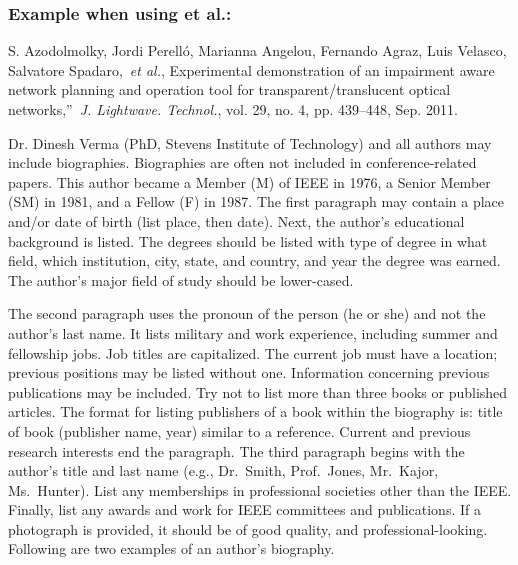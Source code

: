 \documentclass{IEEEoj}
\begin{document}
\subsubsection*{Example when using et al.:}

\begin{thebibliography}{00}
 S. Azodolmolky, Jordi Perell\'{o}, Marianna Angelou, Fernando Agraz, Luis Velasco, Salvatore Spadaro,~\textit{et al.}, Experimental demonstration of an impairment aware network planning and operation tool for transparent/translucent optical networks,''~\textit{J. Lightwave. Technol.}, vol. 29, no. 4, pp. 439--448, Sep. 2011.
\end{thebibliography}

\begin{IEEEbiography}{Dr. Dinesh Verma} (PhD, Stevens Institute of Technology) and all authors may include 
biographies. Biographies are often not included in conference-related
papers. This author became a Member (M) of IEEE in 1976, a Senior
Member (SM) in 1981, and a Fellow (F) in 1987. The first paragraph may
contain a place and/or date of birth (list place, then date). Next,
the author's educational background is listed. The degrees should be
listed with type of degree in what field, which institution, city,
state, and country, and year the degree was earned. The author's major
field of study should be lower-cased. 

The second paragraph uses the pronoun of the person (he or she) and not the 
author's last name. It lists military and work experience, including summer 
and fellowship jobs. Job titles are capitalized. The current job must have a 
location; previous positions may be listed 
without one. Information concerning previous publications may be included. 
Try not to list more than three books or published articles. The format for 
listing publishers of a book within the biography is: title of book 
(publisher name, year) similar to a reference. Current and previous research 
interests end the paragraph. The third paragraph begins with the author's 
title and last name (e.g., Dr.\ Smith, Prof.\ Jones, Mr.\ Kajor, Ms.\ Hunter). 
List any memberships in professional societies other than the IEEE. Finally, 
list any awards and work for IEEE committees and publications. If a 
photograph is provided, it should be of good quality, and 
professional-looking. Following are two examples of an author's biography.
\end{IEEEbiography}
\end{document}
